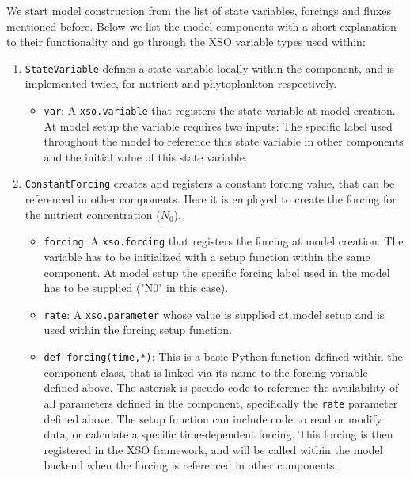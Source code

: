 \documentclass[journal abbreviation, manuscript]{copernicus}
\begin{document}
We start model construction from the list of state variables, forcings and fluxes mentioned before. Below we list the model components with a short explanation to their functionality and go through the XSO variable types used within:
\begin{enumerate}
    \item \texttt{StateVariable} defines a state variable locally within the component, and is implemented twice, for nutrient and phytoplankton respectively.
    \begin{itemize}
        \item \texttt{var}: A \texttt{xso.variable} that registers the state variable at model creation. At model setup the variable requires two inputs: The specific label used throughout the model to reference this state variable in other components and the initial value of this state variable.
    \end{itemize}
    
    \item \texttt{ConstantForcing} creates and registers a constant forcing value, that can be referenced in other components. Here it is employed to create the forcing for the nutrient concentration ($N_0$).
    \begin{itemize}
        \item \texttt{forcing}: A \texttt{xso.forcing} that registers the forcing at model creation. The variable has to be initialized with a setup function within the same component. At model setup the specific forcing label used in the model has to be supplied ("N0" in this case).
        \item \texttt{rate}: A \texttt{xso.parameter} whose value is supplied at model setup and is used within the forcing setup function.
        \item \texttt{def forcing(time,*)}: This is a basic Python function defined within the component class, that is linked via its name to the forcing variable defined above. The asterisk is pseudo-code to reference the availability of all parameters defined in the component, specifically the \texttt{rate} parameter defined above. The setup function can include code to read or modify data, or calculate a specific time-dependent forcing. This forcing is then registered in the XSO framework, and will be called within the model backend when the forcing is referenced in other components.
    \end{itemize}
    

\end{enumerate}
\end{document}
